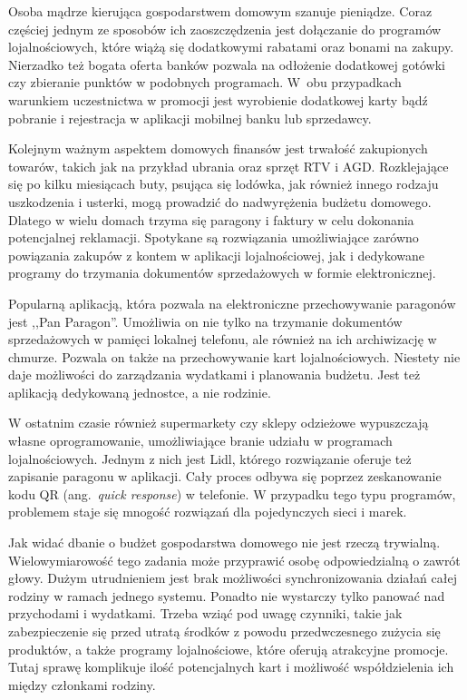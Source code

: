 Osoba mądrze kierująca gospodarstwem domowym szanuje pieniądze. Coraz częściej jednym ze sposobów ich zaoszczędzenia jest dołączanie do programów lojalnościowych, które wiążą się dodatkowymi rabatami oraz bonami na zakupy. Nierzadko też bogata oferta banków pozwala na odłożenie dodatkowej gotówki czy zbieranie punktów w podobnych programach. W~obu przypadkach warunkiem uczestnictwa w promocji jest wyrobienie dodatkowej karty bądź pobranie i rejestracja w aplikacji mobilnej banku lub sprzedawcy.

Kolejnym ważnym aspektem domowych finansów jest trwałość zakupionych towarów, takich jak na przykład ubrania oraz sprzęt RTV i AGD. Rozklejające się po kilku miesiącach buty, psująca się lodówka, jak również innego rodzaju uszkodzenia i usterki, mogą prowadzić do nadwyrężenia budżetu domowego. Dlatego w wielu domach trzyma się paragony i faktury w celu dokonania potencjalnej reklamacji. Spotykane są rozwiązania umożliwiające zarówno powiązania zakupów z kontem w aplikacji lojalnościowej, jak i dedykowane programy do trzymania dokumentów sprzedażowych w formie elektronicznej.

Popularną aplikacją, która pozwala na elektroniczne przechowywanie paragonów jest ,,Pan Paragon''. Umożliwia on nie tylko na trzymanie dokumentów sprzedażowych w pamięci lokalnej telefonu, ale również na ich archiwizację w chmurze. Pozwala on także na przechowywanie kart lojalnościowych. Niestety nie daje możliwości do zarządzania wydatkami i planowania budżetu. Jest też aplikacją dedykowaną jednostce, a nie rodzinie.

W ostatnim czasie również supermarkety czy sklepy odzieżowe wypuszczają własne oprogramowanie, umożliwiające branie udziału w programach lojalnościowych. Jednym z nich jest Lidl, którego rozwiązanie oferuje też zapisanie paragonu w aplikacji. Cały proces odbywa się poprzez zeskanowanie kodu QR (ang.~\emph{quick response}) w telefonie. W przypadku tego typu programów, problemem staje się mnogość rozwiązań dla pojedynczych sieci i marek.

Jak widać dbanie o budżet gospodarstwa domowego nie jest rzeczą trywialną. Wielowymiarowość tego zadania może przyprawić osobę odpowiedzialną o zawrót głowy. Dużym utrudnieniem jest brak możliwości synchronizowania działań całej rodziny w ramach jednego systemu. Ponadto nie wystarczy tylko panować nad przychodami i wydatkami. Trzeba wziąć pod uwagę czynniki, takie jak zabezpieczenie się przed utratą środków z powodu przedwczesnego zużycia się produktów, a także  programy lojalnościowe, które oferują atrakcyjne promocje. Tutaj sprawę komplikuje ilość potencjalnych kart i możliwość współdzielenia ich między członkami rodziny. 

